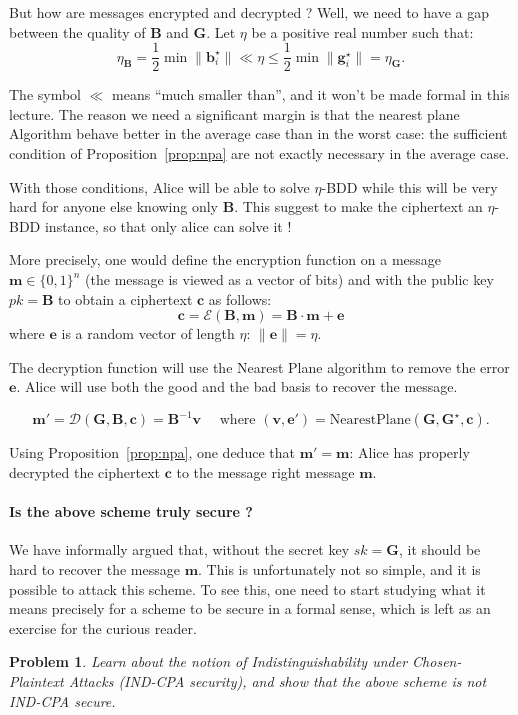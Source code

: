 \documentclass[12pt]{article}
\renewcommand{\vec}{\mathbf}
\newtheorem{problem}{Problem}{\bfseries}{\upshape}
\begin{document}
But how are messages encrypted and decrypted ? Well, we need to have a gap between the quality of $\vec B$ and $\vec G$. Let $\eta$ be a positive real number such that:
\[ \eta_{\vec B} = \frac 1 2 \min \| \vec b^\star_i \| \ll \eta \leq \frac 1 2 \min \| \vec g^\star_i \| = \eta_{\vec G} . \]

The symbol $\ll$ means ``much smaller than'', and it won't be made formal in this lecture. The reason we need a significant margin is that the nearest plane Algorithm behave better in the average case than in the worst case: the sufficient condition of Proposition~\ref{prop:npa} are not exactly necessary in the average case.

With those conditions, Alice will be able to solve $\eta$-BDD while this will be very hard for anyone else knowing only $\vec B$. This suggest to make the ciphertext an $\eta$-BDD instance, so that only alice can solve it !

More precisely, one would define the encryption function on a message $\vec m \in \{0,1\}^n$ (the message is viewed as a vector of bits) and with the public key $pk = \vec B$ to obtain a ciphertext $\vec c$ as follows:
\[ \vec c = \mathcal E(\vec B, \vec m) = \vec B \cdot \vec m + \vec e\]
where $\vec e$ is a random vector of length $\eta$: $\|\vec e\| = \eta$.

The decryption function will use the Nearest Plane algorithm to remove the error $\vec e$. Alice will use both the good and the bad basis to recover the message.

\[ \vec m' = \mathcal D(\vec G, \vec B, \vec c) = \vec B^{-1} \vec v \quad \text{ where } (\vec v, \vec e') = \text{NearestPlane}(\vec G, \vec G^\star, \vec c). \]

Using Proposition~\ref{prop:npa}, one deduce that $\vec m' = \vec m$: Alice has properly decrypted the ciphertext $\vec c$ to the message right message $\vec m$.

\paragraph{Is the above scheme truly secure ?} We have informally argued that, without the secret key $sk = \vec G$, it should be hard to recover the message $\vec m$. This is unfortunately not so simple, and it is possible to attack this scheme. To see this, one need to start studying what it means precisely for a scheme to be secure in a formal sense, which is left as an exercise for the curious reader.

\begin{problem}
  Learn about the notion of Indistinguishability under Chosen-Plaintext Attacks (IND-CPA security), and show that the above scheme is not IND-CPA secure.
\end{problem}
\end{document}
